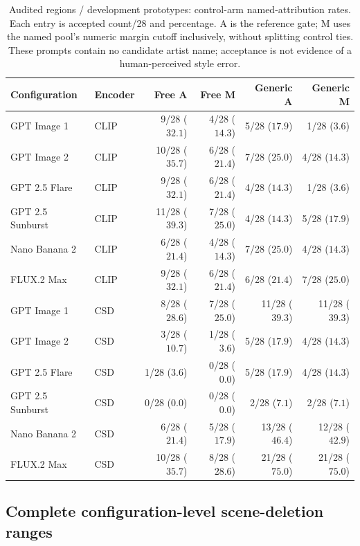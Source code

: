 \begin{table}[!htbp]
\caption{Audited regions / development prototypes: control-arm named-attribution rates. Each entry is accepted count/28 and percentage. A is the reference gate; M uses the named pool's numeric margin cutoff inclusively, without splitting control ties. These prompts contain no candidate artist name; acceptance is not evidence of a human-perceived style error.}
\label{tab:selective-controls-audited-region-development}
\centering\footnotesize\setlength{\tabcolsep}{3pt}
\begin{tabularx}{\linewidth}{@{}Xlrrrr@{}}\toprule
Configuration & Encoder & Free A & Free M & Generic A & Generic M\\\midrule
GPT Image 1 & CLIP & 9/28 ($32.1$) & 4/28 ($14.3$) & 5/28 ($17.9$) & 1/28 ($3.6$)\\
GPT Image 2 & CLIP & 10/28 ($35.7$) & 6/28 ($21.4$) & 7/28 ($25.0$) & 4/28 ($14.3$)\\
GPT 2.5 Flare & CLIP & 9/28 ($32.1$) & 6/28 ($21.4$) & 4/28 ($14.3$) & 1/28 ($3.6$)\\
GPT 2.5 Sunburst & CLIP & 11/28 ($39.3$) & 7/28 ($25.0$) & 4/28 ($14.3$) & 5/28 ($17.9$)\\
Nano Banana 2 & CLIP & 6/28 ($21.4$) & 4/28 ($14.3$) & 7/28 ($25.0$) & 4/28 ($14.3$)\\
FLUX.2 Max & CLIP & 9/28 ($32.1$) & 6/28 ($21.4$) & 6/28 ($21.4$) & 7/28 ($25.0$)\\
GPT Image 1 & CSD & 8/28 ($28.6$) & 7/28 ($25.0$) & 11/28 ($39.3$) & 11/28 ($39.3$)\\
GPT Image 2 & CSD & 3/28 ($10.7$) & 1/28 ($3.6$) & 5/28 ($17.9$) & 4/28 ($14.3$)\\
GPT 2.5 Flare & CSD & 1/28 ($3.6$) & 0/28 ($0.0$) & 5/28 ($17.9$) & 4/28 ($14.3$)\\
GPT 2.5 Sunburst & CSD & 0/28 ($0.0$) & 0/28 ($0.0$) & 2/28 ($7.1$) & 2/28 ($7.1$)\\
Nano Banana 2 & CSD & 6/28 ($21.4$) & 5/28 ($17.9$) & 13/28 ($46.4$) & 12/28 ($42.9$)\\
FLUX.2 Max & CSD & 10/28 ($35.7$) & 8/28 ($28.6$) & 21/28 ($75.0$) & 21/28 ($75.0$)\\
\bottomrule\end{tabularx}
\end{table}
\FloatBarrier
\clearpage\subsection{Complete configuration-level scene-deletion ranges}
